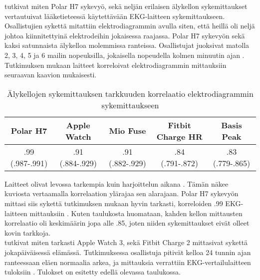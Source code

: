\documentclass[utf8,bachelor,finnish]{bachelor}
\begin{document}
   \textcite{wang_accuracy_2017} tutkivat miten Polar H7 sykevyö, sekä neljän erilaisen älykellon sykemittaukset vertautuivat lääketieteessä käytettävään
    EKG-laitteen sykemittaukseen. Osallistujien sykettä mitattiin elektrodiagrammin avulla siten,
      että heillä oli neljä johtoa kiinnitettyinä elektrodeihin jokaisessa raajassa. Polar H7 sykevyön sekä kaksi satunnaista älykelloa molemmissa ranteissa.
       Osallistujat juoksivat matolla 2, 3, 4, 5 ja 6 mailin nopeuksilla, jokaisella nopeudella kolmen minuutin ajan \parencite{wang_accuracy_2017}.
        Tutkimuksen mukaan laitteet korreloivat elektrodiagrammin mittauksiin seuraavan kaavion mukaisesti.\\


  \begin{table}[h]
    \begin{center}
      \begin{tabular}{||c c c c c||} 
       \hline
       Polar H7 & Apple Watch & Mio Fuse & Fitbit Charge HR & Basis Peak \\ [0.5ex] 
       \hline\hline
       .99 (.987-.991) & .91 (.884-.929) & .91 (.882-.929)& .84 (.791-.872)& .83 (.779-.865)\\
       \hline
      \end{tabular}
    \caption{Älykellojen sykemittauksen tarkkuuden korrelaatio elektrodiagrammin sykemittaukseen \parencite{wang_accuracy_2017}}
      \end{center}
    \end{table}

  Laitteet olivat levossa tarkempia kuin harjoittelun aikana \parencite{wang_accuracy_2017}. Tämän näkee kuviosta vertaamalla korrelaation ylärajaa sen alarajaan.
   Polar H7 sykevyön mittasi siis sykettä tutkimuksen mukaan hyvin tarkasti, korreloiden .99 EKG-laitteen mittauksiin \parencite{wang_accuracy_2017}.
    Kuten taulukosta huomataan, kahden kellon mittausten korrelaatio oli keskimäärin jopa alle .85, joten niiden sykemittaukset eivät olleet kovin tarkkoja.\\
  
  \textcite{nelson_accuracy_2019} tutkivat miten tarkasti Apple Watch 3, sekä Fitbit Charge 2 mittasivat sykettä jokapäiväisessä elämässä.
   Tutkimuksessa osallistuja pitivät kelloa 24 tunnin ajan ranteessaan eläen normaalia arkea, ja mittauksia verrattiin
    EKG-vertailulaitteen tuloksiin \parencite{nelson_accuracy_2019}. Tulokset on esitetty edellä olevassa taulukossa.\\
    
\end{document}
